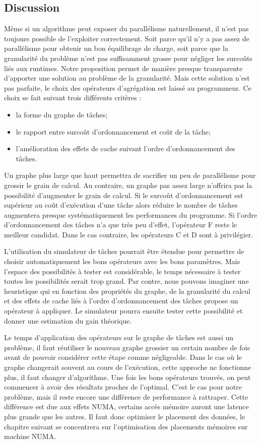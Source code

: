\subsection{Discussion}
Même si un algorithme peut exposer du parallélisme naturellement, il n'est pas toujours possible de l'exploiter correctement.
%
Soit parce qu'il n'y a pas assez de parallélisme pour obtenir un bon équilibrage de charge, soit parce que la granularité du problème n'est pas suffisamment grosse pour négliger les surcoûts liés aux runtimes.
%
Notre proposition permet de manière presque transparente d'apporter une solution au problème de la granularité.
%
Mais cette solution n'est pas parfaite, le choix des opérateurs d'agrégation est laissé au programmeur.
%
Ce choix se fait suivant trois différents critères :
\begin{itemize}
  \item la forme du graphe de tâches;
  \item le rapport entre surcoût d'ordonnancement et coût de la tâche;
  \item l'amélioration des effets de cache suivant l'ordre d'ordonnancement des tâches.
\end{itemize}
%
Un graphe plus large que haut permettra de sacrifier un peu de parallélisme pour grossir le grain de calcul.
%
Au contraire, un graphe pas assez large n'offrira pas la possibilité d'augmenter le grain de calcul.
%
Si le surcoût d'ordonnancement est supérieur au coût d'exécution d'une tâche alors réduire le nombre de tâches augmentera presque systématiquement les performances du programme.
%
Si l'ordre d'ordonnancement des tâches n'a que très peu d'effet, l'opérateur F reste le meilleur candidat.
%
Dans le cas contraire, les opérateurs C et D sont à privilégier.

L'utilisation du simulateur de tâches pourrait être étendue pour permettre de choisir automatiquement les bons opérateurs avec les bons paramètres.
%
Mais l'espace des possibilités à tester est considérable, le temps nécessaire à tester toutes les possibilités serait trop grand.
%
Par contre, nous pouvons imaginer une heuristique qui en fonction des propriétés du graphe, de la granularité du calcul et des effets de cache liés à l'ordre d'ordonnancement des tâches propose un opérateur à appliquer.
%
Le simulateur pourra ensuite tester cette possibilité et donner une estimation du gain théorique.

Le temps d'application des opérateurs sur le graphe de tâches est aussi un problème, il faut réutiliser le nouveau graphe grossier un certain nombre de fois avant de pouvoir considérer cette étape comme négligeable.
%
Dans le cas où le graphe changerait souvent au cours de l'exécution, cette approche ne fonctionne plus, il faut changer d'algorithme.
%
Une fois les bons opérateurs trouvés, on peut commencer à avoir des résultats proches de l'optimal.
%
C'est le cas pour notre problème, mais il reste encore une différence de performance à rattraper.
%
Cette différence est due aux effets NUMA, certains accès mémoire auront une latence plus grande que les autres.
%
Il faut donc optimiser le placement des données, le chapitre suivant se concentrera sur l'optimisation des placements mémoires sur machine NUMA.
